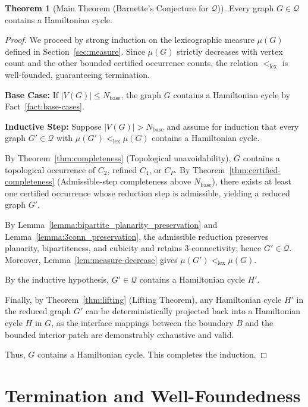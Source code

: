 \documentclass[12pt]{article}
\theoremstyle{definition}
\newtheorem{theorem}{Theorem}
\begin{document}
\begin{theorem}[Main Theorem (Barnette's Conjecture for $\mathcal{Q}$)]
\label{thm:main_barnette}
Every graph $G \in \mathcal{Q}$ contains a Hamiltonian cycle.
\end{theorem}
\begin{proof}
We proceed by strong induction on the lexicographic measure $\mu(G)$ defined in Section~\ref{sec:measure}. Since $\mu(G)$ strictly decreases with vertex count and the other bounded certified occurrence counts, the relation $<_{\text{lex}}$ is well-founded, guaranteeing termination.

\textbf{Base Case:} If $|V(G)| \le N_{\mathrm{base}}$, the graph $G$ contains a Hamiltonian cycle by Fact~\ref{fact:base-cases}.

\textbf{Inductive Step:} Suppose $|V(G)| > N_{\mathrm{base}}$ and assume for induction that every graph $G' \in \mathcal{Q}$ with $\mu(G') <_{\text{lex}} \mu(G)$ contains a Hamiltonian cycle.

By Theorem~\ref{thm:completeness} (Topological unavoidability), $G$ contains a topological occurrence of $C_2$, refined $C_4$, or $C_P$.
By Theorem~\ref{thm:certified-completeness} (Admissible-step completeness above $N_{\mathrm{base}}$), there exists at least one certified occurrence whose reduction step is admissible, yielding a reduced graph $G'$.

By Lemma~\ref{lemma:bipartite_planarity_preservation} and Lemma~\ref{lemma:3conn_preservation}, the admissible reduction preserves planarity, bipartiteness, and cubicity and retains $3$-connectivity; hence $G'\in\mathcal{Q}$. Moreover, Lemma~\ref{lem:measure-decrease} gives $\mu(G') <_{\text{lex}} \mu(G)$.

By the inductive hypothesis, $G' \in \mathcal{Q}$ contains a Hamiltonian cycle $H'$.

Finally, by Theorem~\ref{thm:lifting} (Lifting Theorem), any Hamiltonian cycle $H'$ in the reduced graph $G'$ can be deterministically projected back into a Hamiltonian cycle $H$ in $G$, as the interface mappings between the boundary $B$ and the bounded interior patch are demonstrably exhaustive and valid.

Thus, $G$ contains a Hamiltonian cycle. This completes the induction.
\end{proof}

\section{Termination and Well-Foundedness}
\label{sec:termination}
\end{document}
